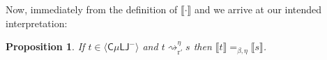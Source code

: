 \documentclass[10pt,a4paper]{amsart}
\theoremstyle{plain}
\newtheorem{proposition}[proposition]{Proposition}
\theoremstyle{definition}
\newcommand{\dfn}{:=}
\newcommand{\red}[1]{{\color{red}#1}}
\newcommand{\anupam}[1]{\todo[color=green]{A: #1}}
\renewcommand{\todo}[1]{}
\renewcommand{\anupam}[1]{}
\newcommand{\todonew}[1]{{\red{TodoNew: #1}}}
\renewcommand{\todonew}[1]{}
\theoremstyle{plain}
\theoremstyle{definition} %
\newcommand{\sem}[1]{\llbracket {#1} \rrbracket}
\newcommand{\Terms}{\mathrm{Ter}}
\newcommand{\terms}{\Terms} %
\newcommand{\regular}{\mathbf R}
\newcommand{\regularterms}{\regular\Terms}
\newcommand{\closure}[1]{\langle #1 \rangle}
\newcommand{\Sys}[1]{\mathcal E_{#1}}
\newcommand{\infrule}{\mathsf{r}}
\newcommand{\rrule}{\infrule} %
\newcommand{\LJ}{\mathsf{LJ}}
\newcommand{\muLJ}{\mu\LJ}
\newcommand{\circular}{\mathsf C}
\newcommand{\cmuLJ}{\circular\muLJ}
\newcommand{\cmuLJneg}{\cmuLJ^-}
\newcommand{\rewrite}{\rightsquigarrow}
\newcommand{\cutreduction}{\mathrm{cr}}
\newcommand{\cutred}{\rewrite_{\cutreduction}}
\newcommand{\cutelim}{\cutred} %
\newcommand{\reductionnorec}{\mathrm{r}'}
\newcommand{\reducesnoreceta}{\rewrite_{\reductionnorec}^\eta} %
\newcommand{\betar}{\rightarrow_\beta^*}
\newcommand{\betaeta}{=_{\beta, \eta}}
\begin{document}

 









Now, immediately from the definition of $\sem\cdot$ and  we arrive at our intended interpretation:

\begin{proposition}\label{prop:cut-elimination-reduction} If $t \in \closure \cmuLJneg$ and $t \reducesnoreceta s$ then $\sem{t}\betaeta \sem{s}$. \anupam{added eta to the reduction (and removed $*$ for typesetting reasons). this is needed in the next corollary and follows from the results referenced in the proof.}
\end{proposition}
\end{document}
